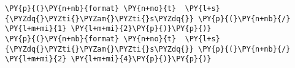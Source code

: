 \begin{Verbatim}[commandchars=\\\{\}]
\PY{p}{(}\PY{n+nb}{format} \PY{n+no}{t}  \PY{l+s}{\PYZdq{}\PYZti{}\PYZam{}\PYZti{}s\PYZdq{}} \PY{p}{(}\PY{n+nb}{/} \PY{l+m+mi}{1} \PY{l+m+mi}{2}\PY{p}{)}\PY{p}{)}
\PY{p}{(}\PY{n+nb}{format} \PY{n+no}{t}  \PY{l+s}{\PYZdq{}\PYZti{}\PYZam{}\PYZti{}s\PYZdq{}} \PY{p}{(}\PY{n+nb}{/} \PY{l+m+mi}{2} \PY{l+m+mi}{4}\PY{p}{)}\PY{p}{)}
\end{Verbatim}
